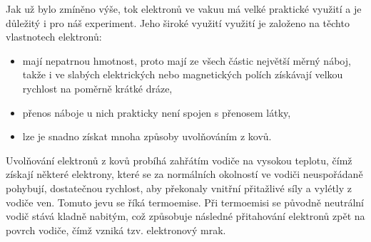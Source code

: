 Jak už bylo zmíněno výše, tok elektronů ve vakuu má velké praktické využití a je důležitý i pro náš experiment. Jeho široké využití využití je založeno na těchto vlastnotech elektronů:

\begin{itemize}
\item mají nepatrnou hmotnost, proto mají ze všech částic největší měrný náboj, takže i ve slabých elektrických nebo magnetických polích získávají velkou rychlost na poměrně krátké dráze,
\item přenos náboje u nich prakticky není spojen s přenosem látky,
\item lze je snadno získat mnoha způsoby uvolňováním z kovů.
\end{itemize}

Uvolňování elektronů z kovů probíhá zahřátím vodiče na vysokou teplotu, čímž získají některé elektrony, které se za normálních okolností ve vodiči neuspořádaně pohybují, dostatečnou rychlost, aby překonaly vnitřní přitažlivé síly a vylétly z vodiče ven. Tomuto jevu se říká termoemise. Při termoemisi se původně neutrální vodič stává kladně nabitým, což způsobuje následné přitahování elektronů zpět na povrch vodiče, čímž vzniká tzv. elektronový mrak. 

%

